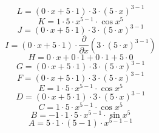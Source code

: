 \documentclass[12pt]{article}
\begin{document}
\begin{equation}
	L = 
\left( 0\cdot x + 5\cdot 1\right) \cdot 3\cdot \left( 5\cdot x\right) ^{3 - 1}
\end{equation}
\begin{equation}
	K = 
1\cdot 5\cdot x^{5 - 1}\cdot \cos {x^{5}}
\end{equation}
\begin{equation}
	J = 
\left( 0\cdot x + 5\cdot 1\right) \cdot 3\cdot \left( 5\cdot x\right) ^{3 - 1}
\end{equation}
\begin{equation}
	I = 
\left( 0\cdot x + 5\cdot 1\right) \cdot \frac{\partial}{\partial x}\left( 3\cdot \left( 5\cdot x\right) ^{3 - 1}\right) 
\end{equation}
\begin{equation}
	H = 
0\cdot x + 0\cdot 1 + 0\cdot 1 + 5\cdot 0
\end{equation}
\begin{equation}
	G = 
\left( 0\cdot x + 5\cdot 1\right) \cdot 3\cdot \left( 5\cdot x\right) ^{3 - 1}
\end{equation}
\begin{equation}
	F = 
\left( 0\cdot x + 5\cdot 1\right) \cdot 3\cdot \left( 5\cdot x\right) ^{3 - 1}
\end{equation}
\begin{equation}
	E = 
1\cdot 5\cdot x^{5 - 1}\cdot \cos {x^{5}}
\end{equation}
\begin{equation}
	D = 
\left( 0\cdot x + 5\cdot 1\right) \cdot 3\cdot \left( 5\cdot x\right) ^{3 - 1}
\end{equation}
\begin{equation}
	C = 
1\cdot 5\cdot x^{5 - 1}\cdot \cos {x^{5}}
\end{equation}
\begin{equation}
	B = 
-1\cdot 1\cdot 5\cdot x^{5 - 1}\cdot \sin {x^{5}}
\end{equation}
\begin{equation}
	A = 
5\cdot 1\cdot \left( 5 - 1\right) \cdot x^{5 - 1 - 1}
\end{equation}
\end{document}

